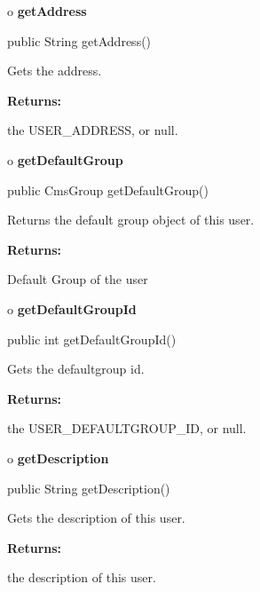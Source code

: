 o {\bf getAddress} 

\begin{PRE}
 public String getAddress()
\end{PRE}

\begin{description}
\htmlDD Gets the address. 

\begin{description}
\item {\bf Returns:}  

the USER\_ADDRESS, or null.  
\end{description}

\end{description}

o {\bf getDefaultGroup} 

\begin{PRE}
 public CmsGroup getDefaultGroup()
\end{PRE}

\begin{description}
\htmlDD Returns the default group object of this user. 

\begin{description}
\item {\bf Returns:}  

Default Group of the user  
\end{description}

\end{description}

o {\bf getDefaultGroupId} 

\begin{PRE}
 public int getDefaultGroupId()
\end{PRE}

\begin{description}
\htmlDD Gets the defaultgroup id. 

\begin{description}
\item {\bf Returns:}  

the USER\_DEFAULTGROUP\_ID, or null.  
\end{description}

\end{description}

o {\bf getDescription} 

\begin{PRE}
 public String getDescription()
\end{PRE}

\begin{description}
\htmlDD Gets the description of this user. 

\begin{description}
\item {\bf Returns:}  

the description of this user.  
\end{description}

\end{description}

